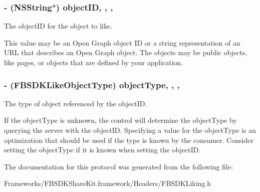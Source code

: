 \subsubsection[{object\+I\+D}]{\setlength{\rightskip}{0pt plus 5cm}-\/ (N\+S\+String$\ast$) object\+I\+D\hspace{0.3cm}{\ttfamily [read]}, {\ttfamily [write]}, {\ttfamily [nonatomic]}, {\ttfamily [copy]}}\label{protocol_f_b_s_d_k_liking-p_ae1fb9b5b4792c73a336120f8101574b5}
The object\+I\+D for the object to like.

This value may be an Open Graph object I\+D or a string representation of an U\+R\+L that describes an Open Graph object. The objects may be public objects, like pages, or objects that are defined by your application. \hypertarget{protocol_f_b_s_d_k_liking-p_a7e888287a80f5cc50af1d423e37f3cda}{}
\subsubsection[{object\+Type}]{\setlength{\rightskip}{0pt plus 5cm}-\/ (F\+B\+S\+D\+K\+Like\+Object\+Type) object\+Type\hspace{0.3cm}{\ttfamily [read]}, {\ttfamily [write]}, {\ttfamily [nonatomic]}, {\ttfamily [assign]}}\label{protocol_f_b_s_d_k_liking-p_a7e888287a80f5cc50af1d423e37f3cda}
The type of object referenced by the object\+I\+D.

If the object\+Type is unknown, the control will determine the object\+Type by querying the server with the object\+I\+D. Specifying a value for the object\+Type is an optimization that should be used if the type is known by the consumer. Consider setting the object\+Type if it is known when setting the object\+I\+D. 

The documentation for this protocol was generated from the following file\+:\begin{DoxyCompactItemize}
\item 
Frameworks/\+F\+B\+S\+D\+K\+Share\+Kit.\+framework/\+Headers/F\+B\+S\+D\+K\+Liking.\+h\end{DoxyCompactItemize}
